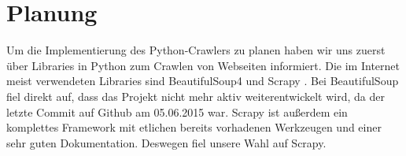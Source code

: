 \chapter{Planung}

Um die Implementierung des Python-Crawlers zu planen haben wir uns zuerst
über Libraries in Python zum Crawlen von Webseiten informiert. Die im
Internet meist verwendeten Libraries sind BeautifulSoup4\cite{beausoup}
und Scrapy\cite{scrapy} . Bei BeautifulSoup fiel direkt auf, dass das Projekt
nicht mehr aktiv weiterentwickelt wird, da der letzte Commit auf Github am
05.06.2015 war. Scrapy ist außerdem ein komplettes Framework mit etlichen
bereits vorhadenen Werkzeugen und einer sehr guten Dokumentation. Deswegen
fiel unsere Wahl auf Scrapy.